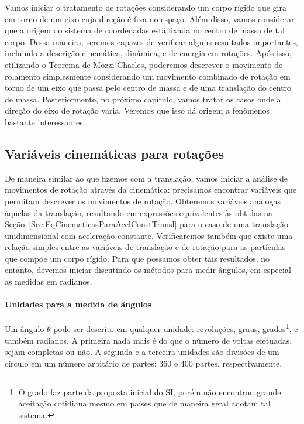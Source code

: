Vamos iniciar o tratamento de rotações considerando um corpo rígido que gira em torno de um eixo cuja direção é fixa no espaço. Além disso, vamos considerar que a origem do sistema de coordenadas está fixada no centro de massa de tal corpo. Dessa maneira, seremos capazes de verificar alguns resultados importantes, incluindo a descrição cinemática, dinâmica, e de energia em rotações. Após isso, etilizando o Teorema de Mozzi-Chasles, poderemos descrever o movimento de rolamento simplesmente considerando um movimento combinado de rotação em torno de um eixo que passa pelo centro de massa e de uma translação do centro de massa. Posteriormente, no próximo capítulo, vamos tratar os casos onde a direção do eixo de rotação varia. Veremos que isso dá origem a fenômenos bastante interessantes.

\subsection{Variáveis cinemáticas para rotações}

De maneira similar ao que fizemos com a translação, vamos iniciar a análise de movimentos de rotação através da cinemática: precisamos encontrar variáveis que permitam descrever os movimentos de rotação. Obteremos variáveis análogas àquelas da translação, resultando em expressões equivalentes às obtidas na Seção~\ref{Sec:EqCinematicasParaAcelConstTransl} para o caso de uma translação unidimensional com aceleração constante. Verificaremos também que existe uma relação simples entre as variáveis de translação e de rotação para as partículas que compõe um corpo rígido. Para que possamos obter tais resultados, no entanto, devemos iniciar discutindo os métodos para medir ângulos, em especial as medidas em radianos. 

\paragraph{Unidades para a medida de ângulos}

Um ângulo $\theta$ pode ser descrito em qualquer unidade: revoluções, graus, grados\footnote{O grado faz parte da proposta inicial do SI, porém não encontrou grande aceitação cotidiana mesmo em países que de maneira geral adotam tal sistema.}, e também radianos. A primeira nada mais é do que o número de voltas efetuadas, sejam completas ou não. A segunda e a terceira unidades são divisões de um círculo em um número arbitário de partes: 360 e 400 partes, respectivamente.

